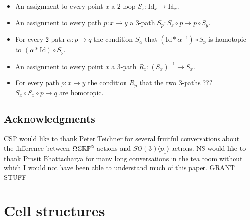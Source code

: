 \documentclass{amsart}
\begin{document}
\begin{itemize}
\item An assignment to every point $x$ a $2$-loop $S_x: \mathrm{Id}_x \rightarrow \mathrm{Id}_x$.
\item An assignment to every path $p:x \rightarrow y$ a $3$-path $S_p: S_x \circ p \rightarrow p \circ S_y$.
\item For every $2$-path $\alpha: p \rightarrow q$ the condition $S_\alpha$ that $(\mathrm{Id} \ast \alpha^{-1}) \circ S_p$ is homotopic to $(\alpha \ast \mathrm{Id}) \circ S_p$.
\end{itemize}

\begin{itemize}
\item An assignment to every point $x$ a $3$-path $R_x: (S_x)^{-1}  \rightarrow S_x$.
\item For every path $p: x \rightarrow y$ the condition $R_p$ that the two $3$-paths ??? $S_x \circ S_x \circ p \rightarrow q$ are homotopic.
\end{itemize}






\subsection*{Acknowledgments}
CSP would like to thank Peter Teichner for several fruitful conversations about the difference between $\Omega \Sigma \mathbb R \mathbb P^2$-actions and $SO(3)\langle p_1 \rangle$-actions.  NS would like to thank Prasit Bhattacharya for many long conversations in the tea room without which I would not have been able to understand much of this paper.  GRANT STUFF



\section{Cell structures}

\end{document}
